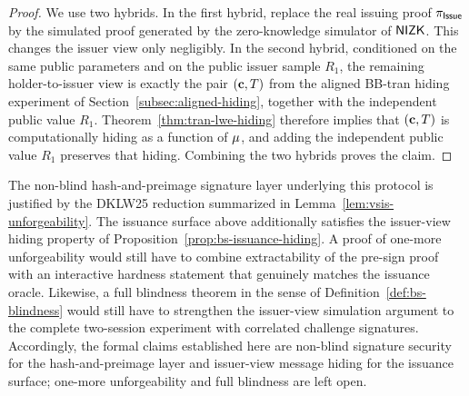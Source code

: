 \begin{proof}
We use two hybrids. In the first hybrid, replace the real issuing proof \(\pi_{\mathsf{Issue}}\) by the simulated proof
generated by the zero-knowledge simulator of \(\mathsf{NIZK}\). This changes the issuer view only negligibly. In the
second hybrid, conditioned on the same public parameters and on the public issuer sample \(R_1\), the remaining
holder-to-issuer view is exactly the pair \((\mathbf{c},T)\) from the aligned BB-tran hiding experiment of
Section~\ref{subsec:aligned-hiding}, together with the independent public value \(R_1\). Theorem~\ref{thm:tran-lwe-hiding}
therefore implies that \((\mathbf{c},T)\) is computationally hiding as a function of \(\mathbf{\mu}\), and adding the independent
public value \(R_1\) preserves that hiding. Combining the two hybrids proves the claim.
\end{proof}

\begin{remark}\label{rem:blind-security-roadmap}
The non-blind hash-and-preimage signature layer underlying this protocol is justified by the DKLW25 reduction
summarized in Lemma~\ref{lem:vsis-unforgeability}. The issuance surface above additionally satisfies the issuer-view
hiding property of Proposition~\ref{prop:bs-issuance-hiding}. A proof of one-more unforgeability would still have to
combine extractability of the pre-sign proof with an interactive hardness statement that genuinely matches the issuance
oracle. Likewise, a full blindness theorem in the sense of Definition~\ref{def:bs-blindness} would still have to
strengthen the issuer-view simulation argument to the complete two-session experiment with correlated challenge
signatures. Accordingly, the formal claims established here are non-blind signature security for the hash-and-preimage
layer and issuer-view message hiding for the issuance surface; one-more unforgeability and full blindness are left
open.
\end{remark}
